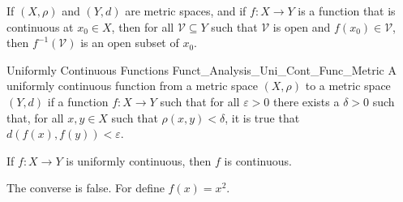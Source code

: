 \documentclass[crop=false,class=book,oneside]{standalone}                      %
\begin{document}
            \begin{theorem}
                If $(X,\rho)$ and $(Y,d)$ are metric spaces, and if
                $f:X\rightarrow{Y}$ is a function that is
                continuous at $x_{0}\in{X}$, then for
                all $\mathcal{V}\subseteq{Y}$ such that
                $\mathcal{V}$ is open and $f(x_{0})\in\mathcal{V}$,
                then $f^{-1}(\mathcal{V})$ is an open subset
                of $x_{0}$.
            \end{theorem}
            \begin{ldefinition}{Uniformly Continuous Functions}
                  {Funct_Analysis_Uni_Cont_Func_Metric}
                A uniformly continuous function from a metric space
                $(X,\rho)$ to a metric space $(Y,d)$ if a function
                $f:X\rightarrow{Y}$ such that for all
                $\varepsilon>0$ there exists a $\delta>0$ such
                that, for all $x,y\in{X}$ such that
                $\rho(x,y)<\delta$, it is true that
                $d(f(x),f(y))<\varepsilon$.
            \end{ldefinition}
            \begin{theorem}
                If $f:X\rightarrow{Y}$ is uniformly continuous,
                then $f$ is continuous.
            \end{theorem}
            The converse is false. For define $f(x)=x^{2}$.
\end{document}

